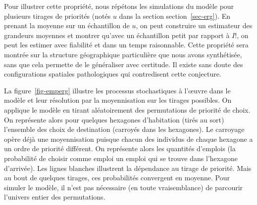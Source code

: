 \documentclass[
  10pt,
  a4paper,
  numbers=noendperiod,
  DIV=9]{scrreprt}
\begin{document}
Pour illustrer cette propriété, nous répétons les simulations du modèle
pour plusieurs tirages de priorités (notés \(u\) dans la section
section~\ref{sec-erg}). En prenant la moyenne sur un échantillon de
\(u\), on peut construire un estimateur des grandeurs moyennes et
montrer qu'avec un échantillon petit par rapport à \(I!\), on peut les
estimer avec fiabilité et dans un temps raisonnable. Cette propriété
sera montrée sur la structure géographique particulière que nous avons
synthétisée, sans que cela permette de le généraliser avec certitude. Il
existe sans doute des configurations spatiales pathologiques qui
contredisent cette conjecture.

La figure~\ref{fig-emperg} illustre les processus stochastiques à
l'œuvre dans le modèle et leur résolution par la moyennisation sur les
tirages possibles. On applique le modèle en tirant aléatoirement des
permutations de priorité de choix. On représente alors pour quelques
hexagones d'habitation (tirés au sort) l'ensemble des choix de
destination (carroyés dans les hexagones). Le carroyage opère déjà une
moyennisation puisque chacun des individus de chaque hexagone a un ordre
de priorité différent. On représente alors les quantités d'emplois (la
probabilité de choisir comme emploi un emploi qui se trouve dans
l'hexagone d'arrivée). Les lignes blanches illustrent la dépendance au
tirage de priorité. Mais au bout de quelques tirages, ces probabilités
convergent en moyenne. Pour simuler le modèle, il n'est pas nécessaire
(en toute vraisemblance) de parcourir l'univers entier des permutations.
\end{document}
